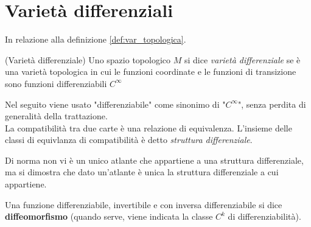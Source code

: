 \section{Varietà differenziali}
\label{sec:vardiff}
In relazione alla definizione \ref{def:var_topologica}.
\begin{definition}{(Varietà differenziale)}
   Uno spazio topologico $M$ si dice \emph{varietà differenziale} se è una
   varietà topologica in cui le funzioni coordinate e le funzioni di transizione
   sono funzioni differenziabili $C^\infty$
\end{definition}

Nel seguito viene usato "differenziabile" come sinonimo di "$C^\infty$", senza
perdita di generalità della trattazione.\\

La compatibilità tra due carte è una relazione di equivalenza. L'insieme delle
classi di equivlanza di compatibilità è detto \emph{struttura differenziale}.

Di norma non vi è un unico atlante che appartiene a una struttura differenziale,
ma si dimostra che dato un'atlante è unica la struttura differenziale a cui appartiene.

Una funzione differenziabile, invertibile e con inversa differenziabile si dice
\textbf{diffeomorfismo} (quando serve, viene indicata la classe $C^k$ di differenziabilità).
